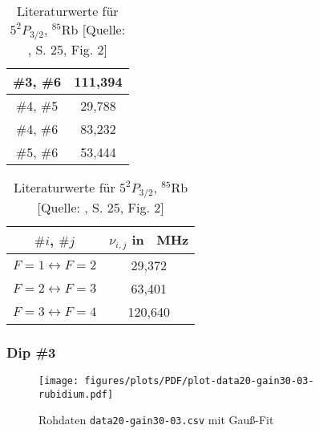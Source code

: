 \begin{table}[H]
\begin{minipage}{8cm}
\begin{tabular}{|c|c|}
            \hline          
            \cellcolor{red!20}   \#3, \#6       &   \cellcolor{red!20}      111,394         \\
            \hline
            \cellcolor{red!20}   \#4, \#5       &   \cellcolor{red!20}       29,788         \\
            \hline
            \cellcolor{green!40} \#4, \#6       &   \cellcolor{green!40}     83,232         \\
            \hline
            \cellcolor{red!20}   \#5, \#6       &   \cellcolor{red!20}       53,444         \\
            \hline
        \end{tabular}
        \caption{Errechnete Frequenzabstände  der Peaks für Dip \textcolor{green!50!black}{\#2}}
        \label{tab:plot-data20-gain30-01-dip-2}
    \end{minipage}
    \hskip0.5cm
    \begin{minipage}{8cm}
        \centering
        \begin{tabular}{|c|c|}
            \hline
            $\#i$, $\#j$    &   $\nu_{i,j}$ in \SI{}{\mega \hertz}  \\
            \hline
            \hline
             $F = 1 \longleftrightarrow F = 2$      &        29,372     \\
            \hline
             $F = 2 \longleftrightarrow F = 3$      &        63,401     \\
            \hline
             $F = 3 \longleftrightarrow F = 4$      &       120,640     \\
            \hline
        \end{tabular}
        \caption{Literaturwerte für $5^{2}P_{3/2}$, $^{85}\text{Rb}$ [Quelle: \cite{Steck85}, S. 25, Fig. 2]}
        \label{tab:lit-5p-85-rb}
    \end{minipage}
\end{table}

\subsubsection{Dip \textcolor{pink!50!purple}{\#3}}

\begin{figure}[H]
    \centering
    \texttt{[image: figures/plots/PDF/plot-data20-gain30-03-rubidium.pdf]}
    \caption{Rohdaten \lstinline{data20-gain30-03.csv} mit Gauß-Fit}
    \label{fig:plot-data20-gain30-03-rubidium}
\end{figure}

